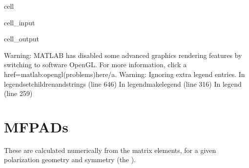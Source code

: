 \documentclass[letterpaper,10pt,english]{jupyterBook}
\begin{document}
\begin{sphinxuseclass}{cell}
\begin{sphinxVerbatimInput}
\begin{sphinxuseclass}{cell_input}
\end{sphinxuseclass}\end{sphinxVerbatimInput}
\begin{sphinxVerbatimOutput}

\begin{sphinxuseclass}{cell_output}
\begin{sphinxVerbatim}[commandchars=\\\{\}]
Warning: MATLAB has disabled some advanced graphics rendering features by switching to software OpenGL. For more information, click \PYGZlt{}a href=\PYGZdq{}matlab:opengl(\PYGZsq{}problems\PYGZsq{})\PYGZdq{}\PYGZgt{}here\PYGZlt{}/a\PYGZgt{}.
Warning: Ignoring extra legend entries.
\PYGZgt{} In legend\PYGZgt{}set\PYGZus{}children\PYGZus{}and\PYGZus{}strings (line 646)
  In legend\PYGZgt{}make\PYGZus{}legend (line 316)
  In legend (line 259)
\end{sphinxVerbatim}

\noindent{}

\end{sphinxuseclass}\end{sphinxVerbatimOutput}

\end{sphinxuseclass}

\section{MFPADs}
\label{\detokenize{testChpt/ePSproc_Matlab_demo_notebook_090821:mfpads}}
\sphinxAtStartPar
These are calculated numerically from the matrix elements, for a given polarization geometry and symmetry (the ).
\end{document}
